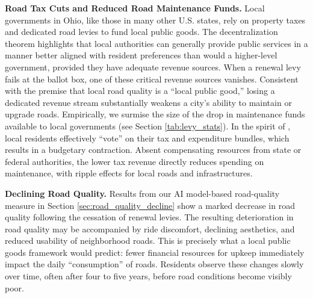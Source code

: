 {\bf Road Tax Cuts and Reduced Road Maintenance Funds.} Local governments in Ohio, like those in many other U.S. states, rely on property taxes and dedicated road levies to fund local public goods. The \cite{Oates1972} decentralization theorem highlights that local authorities can generally provide public services in a manner better aligned with resident preferences than would a higher-level government, provided they have adequate revenue sources. When a renewal levy fails at the ballot box, one of these critical revenue sources vanishes. Consistent with the premise that local road quality is a “local public good,” losing a dedicated revenue stream substantially weakens a city’s ability to maintain or upgrade roads. Empirically, we surmise the size of the drop in maintenance funds available to local governments (see Section \ref{tab:levy_stats}). In the spirit of \cite{Tiebout1956}, local residents effectively “vote” on their tax and expenditure bundles, which results in a budgetary contraction. Absent compensating resources from state or federal authorities, the lower tax revenue directly reduces spending on maintenance, with ripple effects for local roads and infrastructures.


{\bf Declining Road Quality.} Results from our AI model-based road-quality measure in Section \ref{sec:road_quality_decline} show a marked decrease in road quality following the cessation of renewal levies. The resulting deterioration in road quality may be accompanied by ride discomfort, declining aesthetics, and reduced usability of neighborhood roads. This is precisely what a local public goods framework would predict: fewer financial resources for upkeep immediately impact the daily “consumption” of roads. Residents observe these changes slowly over time, often after four to five years, before road conditions become visibly poor.

